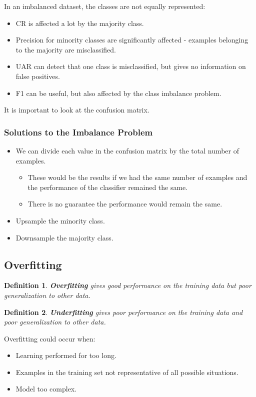 \documentclass[11pt]{article}
\newtheorem{defn}{Definition}
\begin{document}
In an imbalanced dataset, the classes are not equally represented:
\begin{itemize}
  \item CR is affected a lot by the majority class.
  \item Precision for minority classes are significantly affected - examples belonging to the majority are misclassified.
  \item UAR can detect that one class is misclassified, but gives no information on false positives.
  \item F1 can be useful, but also affected by the class imbalance problem.
\end{itemize}

It is important to look at the confusion matrix.

\subsubsection{Solutions to the Imbalance Problem}
\begin{itemize}
  \item We can divide each value in the confusion matrix by the total number of examples.
    \begin{itemize}
      \item These would be the results if we had the same number of examples and the performance of the classifier remained the same.
      \item There is no guarantee the performance would remain the same.
    \end{itemize}
  \item Upsample the minority class.
  \item Downsample the majority class.
\end{itemize}

\subsection{Overfitting}
\begin{defn}
  \textbf{Overfitting} gives good performance on the training data but poor generalization to other data.
\end{defn}

\begin{defn}
  \textbf{Underfitting} gives poor performance on the training data and poor generalization to other data.
\end{defn}

Overfitting could occur when:
\begin{itemize}
  \item Learning performed for too long.
  \item Examples in the training set not representative of all possible situations.
  \item Model too complex.
\end{itemize}
\end{document}
